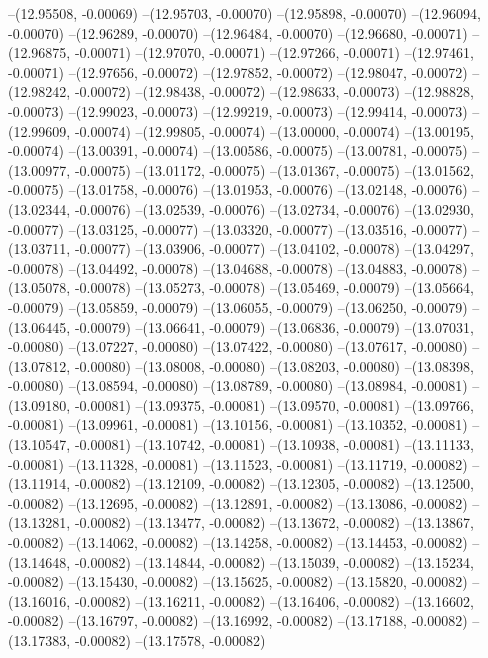 --(12.95508, -0.00069)
--(12.95703, -0.00070)
--(12.95898, -0.00070)
--(12.96094, -0.00070)
--(12.96289, -0.00070)
--(12.96484, -0.00070)
--(12.96680, -0.00071)
--(12.96875, -0.00071)
--(12.97070, -0.00071)
--(12.97266, -0.00071)
--(12.97461, -0.00071)
--(12.97656, -0.00072)
--(12.97852, -0.00072)
--(12.98047, -0.00072)
--(12.98242, -0.00072)
--(12.98438, -0.00072)
--(12.98633, -0.00073)
--(12.98828, -0.00073)
--(12.99023, -0.00073)
--(12.99219, -0.00073)
--(12.99414, -0.00073)
--(12.99609, -0.00074)
--(12.99805, -0.00074)
--(13.00000, -0.00074)
--(13.00195, -0.00074)
--(13.00391, -0.00074)
--(13.00586, -0.00075)
--(13.00781, -0.00075)
--(13.00977, -0.00075)
--(13.01172, -0.00075)
--(13.01367, -0.00075)
--(13.01562, -0.00075)
--(13.01758, -0.00076)
--(13.01953, -0.00076)
--(13.02148, -0.00076)
--(13.02344, -0.00076)
--(13.02539, -0.00076)
--(13.02734, -0.00076)
--(13.02930, -0.00077)
--(13.03125, -0.00077)
--(13.03320, -0.00077)
--(13.03516, -0.00077)
--(13.03711, -0.00077)
--(13.03906, -0.00077)
--(13.04102, -0.00078)
--(13.04297, -0.00078)
--(13.04492, -0.00078)
--(13.04688, -0.00078)
--(13.04883, -0.00078)
--(13.05078, -0.00078)
--(13.05273, -0.00078)
--(13.05469, -0.00079)
--(13.05664, -0.00079)
--(13.05859, -0.00079)
--(13.06055, -0.00079)
--(13.06250, -0.00079)
--(13.06445, -0.00079)
--(13.06641, -0.00079)
--(13.06836, -0.00079)
--(13.07031, -0.00080)
--(13.07227, -0.00080)
--(13.07422, -0.00080)
--(13.07617, -0.00080)
--(13.07812, -0.00080)
--(13.08008, -0.00080)
--(13.08203, -0.00080)
--(13.08398, -0.00080)
--(13.08594, -0.00080)
--(13.08789, -0.00080)
--(13.08984, -0.00081)
--(13.09180, -0.00081)
--(13.09375, -0.00081)
--(13.09570, -0.00081)
--(13.09766, -0.00081)
--(13.09961, -0.00081)
--(13.10156, -0.00081)
--(13.10352, -0.00081)
--(13.10547, -0.00081)
--(13.10742, -0.00081)
--(13.10938, -0.00081)
--(13.11133, -0.00081)
--(13.11328, -0.00081)
--(13.11523, -0.00081)
--(13.11719, -0.00082)
--(13.11914, -0.00082)
--(13.12109, -0.00082)
--(13.12305, -0.00082)
--(13.12500, -0.00082)
--(13.12695, -0.00082)
--(13.12891, -0.00082)
--(13.13086, -0.00082)
--(13.13281, -0.00082)
--(13.13477, -0.00082)
--(13.13672, -0.00082)
--(13.13867, -0.00082)
--(13.14062, -0.00082)
--(13.14258, -0.00082)
--(13.14453, -0.00082)
--(13.14648, -0.00082)
--(13.14844, -0.00082)
--(13.15039, -0.00082)
--(13.15234, -0.00082)
--(13.15430, -0.00082)
--(13.15625, -0.00082)
--(13.15820, -0.00082)
--(13.16016, -0.00082)
--(13.16211, -0.00082)
--(13.16406, -0.00082)
--(13.16602, -0.00082)
--(13.16797, -0.00082)
--(13.16992, -0.00082)
--(13.17188, -0.00082)
--(13.17383, -0.00082)
--(13.17578, -0.00082)
